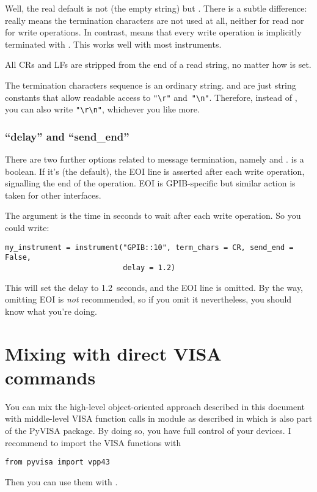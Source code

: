 \documentclass{howto}
\begin{document}
Well, the real default is not  (the empty string) but .
There is a subtle difference:  really means the termination characters
are not used at all, neither for read nor for write operations.  In contrast,
 means that every write operation is implicitly terminated with
\@.  This works well with most instruments.

All CRs and LFs are stripped from the end of a read string, no matter how
 is set.

The termination characters sequence is an ordinary string.   and
 are just string constants that allow readable access to \verb|"\r"|
and~\verb|"\n"|.  Therefore, instead of , you can also write
\verb|"\r\n"|, whichever you like more.

\subsubsection{``delay'' and ``send\_end''}

There are two further options related to message termination, namely
 and .   is a boolean.  If it's
 (the default), the EOI line is asserted after each write operation,
signalling the end of the operation.  EOI is GPIB-specific but similar action
is taken for other interfaces.

The argument  is the time in seconds to wait after each write
operation.  So you could write:
\begin{verbatim}
my_instrument = instrument("GPIB::10", term_chars = CR, send_end = False,
                           delay = 1.2)
\end{verbatim}
This will set the delay to 1.2~seconds, and the EOI line is omitted.  By the
way, omitting EOI is \emph{not} recommended, so if you omit it nevertheless,
you should know what you're doing.


\section{Mixing with direct VISA commands}

You can mix the high-level object-oriented approach described in this document
with middle-level VISA function calls in module  as described in
 which is also part of the PyVISA package.  By doing so, you
have full control of your devices.  I recommend to import the VISA functions
with
\begin{verbatim}
from pyvisa import vpp43
\end{verbatim}
Then you can use them with .
\end{document}
